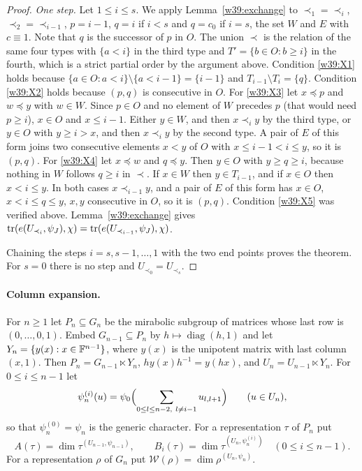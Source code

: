 \begin{proof}
\emph{One step.} Let $1\le i\le s$. We apply Lemma~\ref{w39:exchange} to $\prec_1=\prec_i$, $\prec_2=\prec_{i-1}$, $p=i-1$, $q=i$ if $i<s$ and $q=c_0$ if $i=s$, the set $W$ and $E$ with $c\equiv1$. Note that $q$ is the successor of $p$ in $O$. The union $\prec$ is the relation of the same four types with $\{a<i\}$ in the third type and $T'=\{b\in O:b\ge i\}$ in the fourth, which is a strict partial order by the argument above. Condition \ref{w39:X1} holds because $\{a\in O:a<i\}\setminus\{a<i-1\}=\{i-1\}$ and $T_{i-1}\setminus T_i=\{q\}$. Condition \ref{w39:X2} holds because $(p,q)$ is consecutive in $O$. For \ref{w39:X3} let $x\preceq p$ and $w\preceq y$ with $w\in W$. Since $p\in O$ and no element of $W$ precedes $p$ (that would need $p\ge i$), $x\in O$ and $x\le i-1$. Either $y\in W$, and then $x\prec_iy$ by the third type, or $y\in O$ with $y\ge i>x$, and then $x\prec_iy$ by the second type. A pair of $E$ of this form joins two consecutive elements $x<y$ of $O$ with $x\le i-1<i\le y$, so it is $(p,q)$. For \ref{w39:X4} let $x\preceq w$ and $q\preceq y$. Then $y\in O$ with $y\ge q\ge i$, because nothing in $W$ follows $q\ge i$ in $\prec$. If $x\in W$ then $y\in T_{i-1}$, and if $x\in O$ then $x<i\le y$. In both cases $x\prec_{i-1}y$, and a pair of $E$ of this form has $x\in O$, $x<i\le q\le y$, $x,y$ consecutive in $O$, so it is $(p,q)$. Condition \ref{w39:X5} was verified above. Lemma~\ref{w39:exchange} gives $\operatorname{tr}(e(U_{\prec_i},\psi_J),\chi)=\operatorname{tr}(e(U_{\prec_{i-1}},\psi_J),\chi)$.

Chaining the steps $i=s,s-1,\dots,1$ with the two end points proves the theorem. For $s=0$ there is no step and $U_{\prec_0}=U_{\prec_s}$.
\end{proof}

\paragraph{Column expansion.}

For $n\ge1$ let $P_n\subseteq G_n$ be the mirabolic subgroup of matrices whose last row is $(0,\dots,0,1)$. Embed $G_{n-1}\subseteq P_n$ by $h\mapsto\operatorname{diag}(h,1)$ and let $Y_n=\{y(x):x\in\mathbb F^{n-1}\}$, where $y(x)$ is the unipotent matrix with last column $(x,1)$. Then $P_n=G_{n-1}\ltimes Y_n$, $hy(x)h^{-1}=y(hx)$, and $U_n=U_{n-1}\ltimes Y_n$. For $0\le i\le n-1$ let
\[
\psi^{(i)}_n(u)=\psi_0\Bigl(\sum_{0\le l\le n-2,\ l\ne i-1}u_{l,l+1}\Bigr)\qquad(u\in U_n),
\]
so that $\psi^{(0)}_n=\psi_n$ is the generic character. For a representation $\tau$ of $P_n$ put
\[
A(\tau)=\dim\tau^{(U_{n-1},\psi_{n-1})},\qquad B_i(\tau)=\dim\tau^{(U_n,\psi^{(i)}_n)}\quad(0\le i\le n-1).
\]
For a representation $\rho$ of $G_n$ put $\mathcal W(\rho)=\dim\rho^{(U_n,\psi_n)}$.

